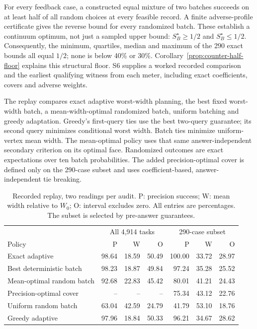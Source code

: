 For every feedback case, a constructed equal mixture of two batches
succeeds on at least half of all random choices at every feasible record.
A finite adverse-profile certificate gives the reverse bound for every
randomized batch. These establish a continuum optimum, not just a sampled
upper bound: $S_B^\star\geq1/2$ and $S_B^\star\leq1/2$.
Consequently, the minimum, quartiles, median and maximum of the 290 exact
bounds all equal $1/2$; none is below 40\% or 30\%.
Corollary~\ref{prop:counter-half-floor} explains this structural floor.
S6 supplies a worked recorded comparison and the earliest qualifying witness from each meter,
including exact coefficients, covers and adverse weights.

The replay compares exact adaptive worst-width planning, the best fixed
worst-width batch, a mean-width-optimal randomized batch, uniform batching
and greedy adaptation. Greedy's first-query ties use the best two-query
guarantee; its second query minimizes conditional worst width. Batch ties
minimize uniform-vertex mean width. The mean-optimal policy uses that same
answer-independent secondary criterion on its optimal face. Randomized
outcomes are exact expectations over ten batch probabilities. The added
precision-optimal cover is defined only on the 290-case subset and uses
coefficient-based, answer-independent tie breaking.

\begin{table}[htbp]\centering\small\setlength{\tabcolsep}{4pt}
\caption{Recorded replay, two readings per audit. P: precision success;
W: mean width relative to $W_0$; O: interval excludes zero. All entries
are percentages. The subset is selected by pre-answer guarantees.}
\label{tab:counter-replay}
\begin{tabular}{lrrrrrr}\toprule
 & \multicolumn{3}{c}{All 4,914 tasks} & \multicolumn{3}{c}{290-case subset}\\
Policy & P & W & O & P & W & O\\\midrule
Exact adaptive & 98.64 & 18.59 & 50.49 & 100.00 & 33.72 & 28.97\\
Best deterministic batch & 98.23 & 18.87 & 49.84 & 97.24 & 35.28 & 25.52\\
Mean-optimal random batch & 92.68 & 22.83 & 45.42 & 80.01 & 41.21 & 24.43\\
Precision-optimal cover & -- & -- & -- & 75.34 & 43.12 & 22.76\\
Uniform random batch & 63.04 & 42.59 & 24.79 & 41.79 & 53.10 & 18.76\\
Greedy adaptive & 97.96 & 18.84 & 50.33 & 96.21 & 34.67 & 28.62\\\bottomrule
\end{tabular}\end{table}
\FloatBarrier

